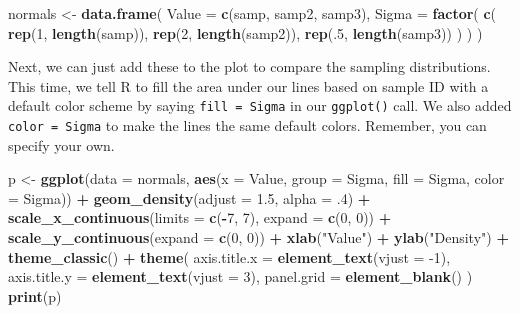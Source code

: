 \documentclass[
]{book}
\newenvironment{Shaded}{\begin{snugshade}}{\end{snugshade}}
\newcommand{\DataTypeTok}[1]{\textcolor[rgb]{0.13,0.29,0.53}{#1}}
\newcommand{\DecValTok}[1]{\textcolor[rgb]{0.00,0.00,0.81}{#1}}
\newcommand{\FloatTok}[1]{\textcolor[rgb]{0.00,0.00,0.81}{#1}}
\newcommand{\KeywordTok}[1]{\textcolor[rgb]{0.13,0.29,0.53}{\textbf{#1}}}
\newcommand{\NormalTok}[1]{#1}
\newcommand{\OperatorTok}[1]{\textcolor[rgb]{0.81,0.36,0.00}{\textbf{#1}}}
\newcommand{\StringTok}[1]{\textcolor[rgb]{0.31,0.60,0.02}{#1}}
\begin{document}
\begin{Shaded}
\begin{Highlighting}[]
\NormalTok{normals <-}\StringTok{ }\KeywordTok{data.frame}\NormalTok{(}
  \DataTypeTok{Value =} \KeywordTok{c}\NormalTok{(samp, samp2, samp3),}
  \DataTypeTok{Sigma =} \KeywordTok{factor}\NormalTok{(}
    \KeywordTok{c}\NormalTok{(}
      \KeywordTok{rep}\NormalTok{(}\DecValTok{1}\NormalTok{, }\KeywordTok{length}\NormalTok{(samp)), }
      \KeywordTok{rep}\NormalTok{(}\DecValTok{2}\NormalTok{, }\KeywordTok{length}\NormalTok{(samp2)), }
      \KeywordTok{rep}\NormalTok{(.}\DecValTok{5}\NormalTok{, }\KeywordTok{length}\NormalTok{(samp3))}
\NormalTok{    )}
\NormalTok{  )}
\NormalTok{)}
\end{Highlighting}
\end{Shaded}

Next, we can just add these to the plot to compare the sampling distributions. This time, we tell R to fill the area under our lines based on sample ID with a default color scheme by saying \texttt{fill\ =\ Sigma} in our \texttt{ggplot()} call. We also added \texttt{color\ =\ Sigma} to make the lines the same default colors. Remember, you can specify your own.

\begin{Shaded}
\begin{Highlighting}[]
\NormalTok{p <-}\StringTok{ }\KeywordTok{ggplot}\NormalTok{(}\DataTypeTok{data =}\NormalTok{ normals, }
            \KeywordTok{aes}\NormalTok{(}\DataTypeTok{x =}\NormalTok{ Value, }\DataTypeTok{group =}\NormalTok{ Sigma, }\DataTypeTok{fill =}\NormalTok{ Sigma, }\DataTypeTok{color =}\NormalTok{ Sigma)) }\OperatorTok{+}
\StringTok{  }\KeywordTok{geom_density}\NormalTok{(}\DataTypeTok{adjust =} \FloatTok{1.5}\NormalTok{, }\DataTypeTok{alpha =} \FloatTok{.4}\NormalTok{) }\OperatorTok{+}
\StringTok{  }\KeywordTok{scale_x_continuous}\NormalTok{(}\DataTypeTok{limits =} \KeywordTok{c}\NormalTok{(}\OperatorTok{-}\DecValTok{7}\NormalTok{, }\DecValTok{7}\NormalTok{), }\DataTypeTok{expand =} \KeywordTok{c}\NormalTok{(}\DecValTok{0}\NormalTok{, }\DecValTok{0}\NormalTok{)) }\OperatorTok{+}\StringTok{ }
\StringTok{  }\KeywordTok{scale_y_continuous}\NormalTok{(}\DataTypeTok{expand =} \KeywordTok{c}\NormalTok{(}\DecValTok{0}\NormalTok{, }\DecValTok{0}\NormalTok{)) }\OperatorTok{+}\StringTok{ }
\StringTok{  }\KeywordTok{xlab}\NormalTok{(}\StringTok{"Value"}\NormalTok{) }\OperatorTok{+}
\StringTok{  }\KeywordTok{ylab}\NormalTok{(}\StringTok{"Density"}\NormalTok{) }\OperatorTok{+}
\StringTok{  }\KeywordTok{theme_classic}\NormalTok{() }\OperatorTok{+}
\StringTok{  }\KeywordTok{theme}\NormalTok{(}
    \DataTypeTok{axis.title.x =} \KeywordTok{element_text}\NormalTok{(}\DataTypeTok{vjust =} \DecValTok{-1}\NormalTok{),}
    \DataTypeTok{axis.title.y =} \KeywordTok{element_text}\NormalTok{(}\DataTypeTok{vjust =} \DecValTok{3}\NormalTok{),}
    \DataTypeTok{panel.grid =} \KeywordTok{element_blank}\NormalTok{()}
\NormalTok{  )}
\KeywordTok{print}\NormalTok{(p)}
\end{Highlighting}
\end{Shaded}
\end{document}
